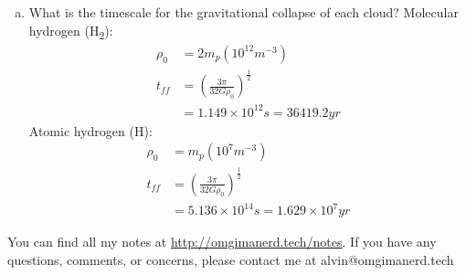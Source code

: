\documentclass{math}
\begin{document}
\begin{enumerate}[(a)]
  \item What is the timescale for the gravitational collapse of each cloud?
  Molecular hydrogen (H\textsubscript{2}):
  \begin{align*}
    \rho_{0} &= 2m_p(10^{12}m^{-3}) \\
    t_{ff} &= \left(\frac{3\pi}{32G\rho_0}\right)^{\frac{1}{2}} \\
    &= 1.149\times10^{12}s = 36419.2yr
  \end{align*}
  Atomic hydrogen (H):
  \begin{align*}
    \rho_{0} &= m_p(10^{7}m^{-3}) \\
    t_{ff} &= \left(\frac{3\pi}{32G\rho_0}\right)^{\frac{1}{2}} \\
    &= 5.136\times10^{14}s = 1.629\times10^7yr
  \end{align*}
\end{enumerate}

\begin{center}
  You can find all my notes at \url{http://omgimanerd.tech/notes}. If you have
  any questions, comments, or concerns, please contact me at
  alvin@omgimanerd.tech
\end{center}
\end{document}
